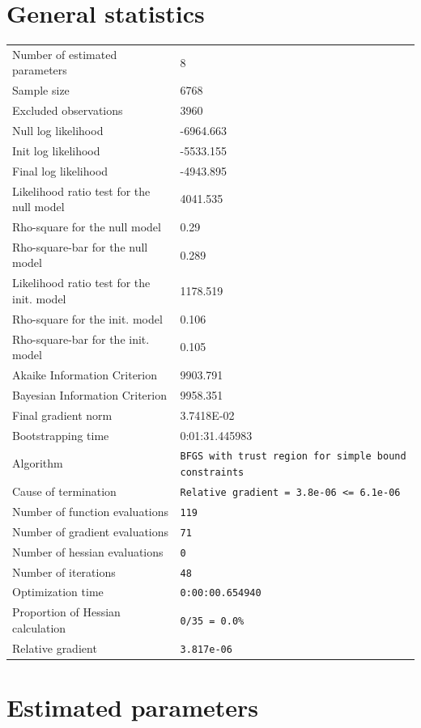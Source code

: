 \documentclass{article}
\begin{document}
\section{General statistics}
\begin{tabular}{ll}
Number of estimated parameters & 8 \\
Sample size & 6768 \\
Excluded observations & 3960 \\
Null log likelihood & -6964.663 \\
Init log likelihood & -5533.155 \\
Final log likelihood & -4943.895 \\
Likelihood ratio test for the null model & 4041.535 \\
Rho-square for the null model & 0.29 \\
Rho-square-bar for the null model & 0.289 \\
Likelihood ratio test for the init. model & 1178.519 \\
Rho-square for the init. model & 0.106 \\
Rho-square-bar for the init. model & 0.105 \\
Akaike Information Criterion & 9903.791 \\
Bayesian Information Criterion & 9958.351 \\
Final gradient norm & 3.7418E-02 \\
Bootstrapping time & 0:01:31.445983 \\
Algorithm & \verb$BFGS with trust region for simple bound constraints$ \\
Cause of termination & \verb$Relative gradient = 3.8e-06 <= 6.1e-06$ \\
Number of function evaluations & \verb$119$ \\
Number of gradient evaluations & \verb$71$ \\
Number of hessian evaluations & \verb$0$ \\
Number of iterations & \verb$48$ \\
Optimization time & \verb$0:00:00.654940$ \\
Proportion of Hessian calculation & \verb$0/35 = 0.0%$ \\
Relative gradient & \verb$3.817e-06$ \\
\end{tabular}
\section{Estimated parameters}
\end{document}

